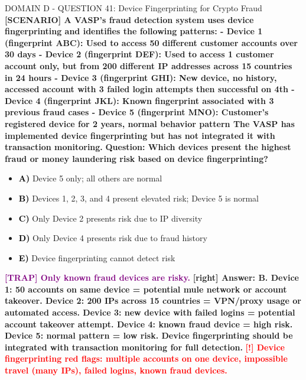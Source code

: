\documentclass[11pt,a4paper]{beamer}
\newcommand{\redflag}[1]{\textcolor{red}{\textbf{[!] #1}}}
\newcommand{\trap}[1]{\textcolor{purple}{\textbf{[TRAP] #1}}}
\newcommand{\correct}[1]{\textcolor{green!50!black}{\textbf{[right] #1}}}
\newcommand{\scenario}[1]{\textcolor{blue!70!black}{\textbf{[SCENARIO] #1}}}
\newcommand{\option}[1]{\textcolor{black}{\textbf{#1}}}
\begin{document}
\begin{frame}{DOMAIN D - QUESTION 41: Device Fingerprinting for Crypto Fraud}
\scenario{A VASP's fraud detection system uses device fingerprinting and identifies the following patterns:
- Device 1 (fingerprint ABC): Used to access 50 different customer accounts over 30 days
- Device 2 (fingerprint DEF): Used to access 1 customer account only, but from 200 different IP addresses across 15 countries in 24 hours
- Device 3 (fingerprint GHI): New device, no history, accessed account with 3 failed login attempts then successful on 4th
- Device 4 (fingerprint JKL): Known fingerprint associated with 3 previous fraud cases
- Device 5 (fingerprint MNO): Customer's registered device for 2 years, normal behavior pattern
The VASP has implemented device fingerprinting but has not integrated it with transaction monitoring.}
\vspace{0.2cm}
\textbf{Question: Which devices present the highest fraud or money laundering risk based on device fingerprinting?}
\vspace{0.1cm}
\begin{itemize}
    \item \option{A)} Device 5 only; all others are normal
    \item \option{B)} Devices 1, 2, 3, and 4 present elevated risk; Device 5 is normal
    \item \option{C)} Only Device 2 presents risk due to IP diversity
    \item \option{D)} Only Device 4 presents risk due to fraud history
    \item \option{E)} Device fingerprinting cannot detect risk
\end{itemize}
\vspace{0.2cm}
\trap{Only known fraud devices are risky.}
\correct{Answer: B. Device 1: 50 accounts on same device = potential mule network or account takeover. Device 2: 200 IPs across 15 countries = VPN/proxy usage or automated access. Device 3: new device with failed logins = potential account takeover attempt. Device 4: known fraud device = high risk. Device 5: normal pattern = low risk. Device fingerprinting should be integrated with transaction monitoring for full detection.}
\redflag{Device fingerprinting red flags: multiple accounts on one device, impossible travel (many IPs), failed logins, known fraud devices.}
\end{frame}
\end{document}
